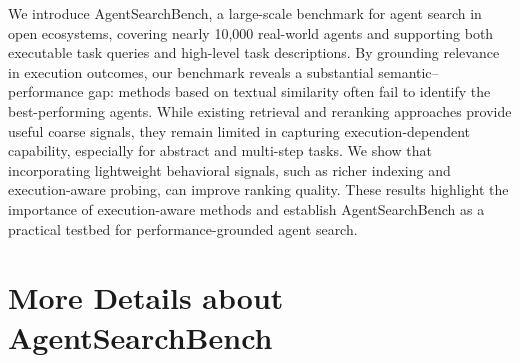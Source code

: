 \documentclass{article} %
\newcommand{\OURSBENCH}{AgentSearchBench}
\begin{document}
We introduce \OURSBENCH{}, a large-scale benchmark for agent search in open ecosystems, covering nearly 10,000 real-world agents and supporting both executable task queries and high-level task descriptions. By grounding relevance in execution outcomes, our benchmark reveals a substantial semantic–performance gap: methods based on textual similarity often fail to identify the best-performing agents. While existing retrieval and reranking approaches provide useful coarse signals, they remain limited in capturing execution-dependent capability, especially for abstract and multi-step tasks. We show that incorporating lightweight behavioral signals, such as richer indexing and execution-aware probing, can improve ranking quality. These results highlight the importance of execution-aware methods and establish \OURSBENCH{} as a practical testbed for performance-grounded agent search.








\clearpage
\appendix
\section{More Details about \OURSBENCH{}}
\end{document}
